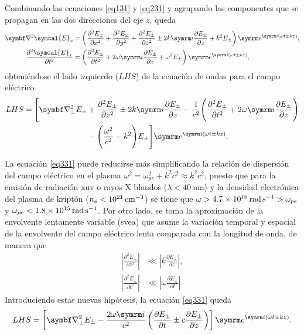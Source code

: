 Combinando las ecuaciones \eqref{eq131} y \eqref{eq231} y agrupando las componentes que se propagan en las dos direcciones del eje $z$, queda 
\begin{align}
    \nab^2\symcal{E}_x
    &=
    \left(\frac{\partial^2 E_{\pm}}{\partial x^2} + \frac{\partial^2 E_{\pm}}{\partial y^2} + \frac{\partial^2 E_{\pm}}{\partial z^2} \pm 2k\iu\frac{\partial E_{\pm}}{\partial z} + k^2 E_{\pm}\right)\eu^{\iu(\omega t \pm kz)}, \\
    \frac{\partial^2 \symcal{E}_x}{\partial t^2}
    &=
    \left(\frac{\partial^2 E_{\pm}}{\partial t^2} + 2\omega\iu\frac{\partial E_{\pm}}{\partial z} + \omega^2E_{\pm}\right)\eu^{\iu(\omega t \pm kz)}, 
\end{align}
\noindent
obteniéndose el lado izquierdo ($LHS$) de la ecuación de ondas para el campo eléctrico
\begin{equation}
    \begin{split}
        LHS 
        =
        \Bigg[\nab^2_{\perp} E_{\pm} &+ \frac{\partial^2 E_{\pm}}{\partial z^2} \pm 2k\iu \frac{\partial E_{\pm}}{\partial z} 
        -\frac{1}{c^2} \Bigg(\frac{\partial^2 E_{\pm}}{\partial t^2} + 2\omega\iu\frac{\partial E_{\pm}}{\partial z} \Bigg) \\
        &- \Bigg(\frac{\omega^2}{c^2} - k^2 \Bigg)E_{\pm} \Bigg] \eu^{\iu(\omega t \pm kz)}.
    \end{split}
\label{eq331}
\end{equation}

La ecuación \eqref{eq331} puede reducirse más simplificando la relación de dispersión del campo eléctrico en el plasma $\omega^2 = \omega_{pe}^2 + k^2c^2\approx k^2c^2$, puesto que para la emisión de radiación \acrshort{xuv} o rayos X blandos ($\lambda<\qty{40}{\nm}$) y la densidad electrónica del plasma de kriptón ($n_e<\qty{d21}{cm^{-3}}$) se tiene 
que $\omega>\qty{4,7d16}{\radian\per\s}>\omega_{pe}$ y $\omega_{pe}<\qty{1,8d15}{\radian\per\s}$. Por otro lado, se toma la aproximación de la envolvente lentamente variable (\acrshort{svea}) que asume la variación temporal y espacial de la envolvente del campo eléctrico lenta comparada con la longitud de onda, de manera que
\begin{align}
    \left|\frac{\partial^2 E_{\pm}}{\partial z^2}\right| &\ll \left|k\frac{\partial E_{\pm}}{\partial z}\right|, \\
     \left|\frac{\partial^2 E_{\pm}}{\partial t^2}\right| &\ll \left|\omega\frac{\partial E_{\pm}}{\partial t}\right|.
\end{align}
\noindent
Introduciendo estas nuevas hipótesis, la ecuación \eqref{eq331} queda
\begin{equation}
    LHS 
    =
    \left[\nab^2_{\perp}E_{\pm} - \frac{2\omega\iu}{c^2}\left(\frac{\partial E_{\pm}}{\partial t} \pm c\frac{\partial E_{\pm}}{\partial z}\right)\right]\eu^{\iu(\omega t \pm kz)}.
\end{equation}

